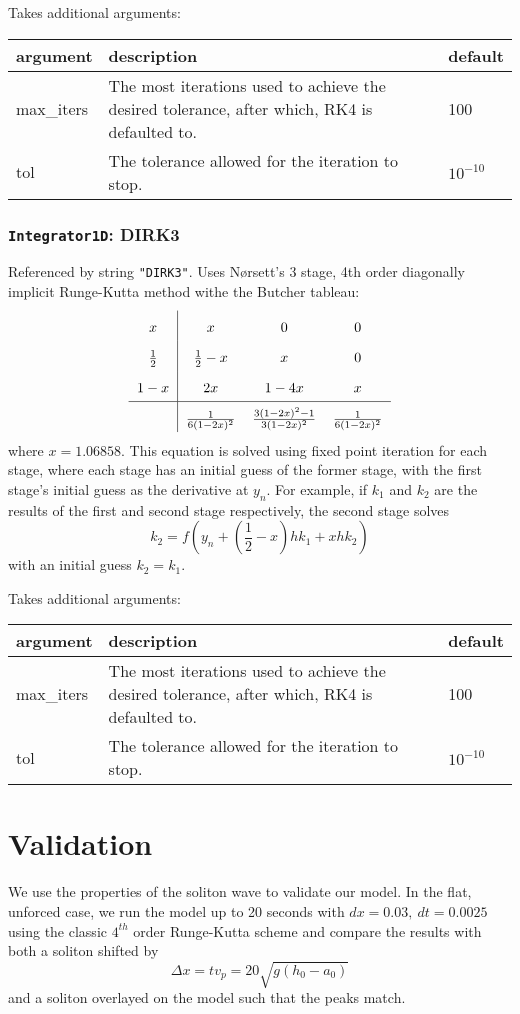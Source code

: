 \documentclass[10pt,a4paper]{article}
\newenvironment{optarglist}
    {\begin{center}
    \begin{tabular}{l|p{10cm}|l}
    argument & description & default\\
    \hline
    }
    { 
    \end{tabular} 
    \end{center}
    }
\begin{document}
Takes additional arguments:

\begin{optarglist}
max\_iters & The most iterations used to achieve the desired tolerance, after which, RK4 is defaulted to. & 100\\\hline
tol & The tolerance allowed for the iteration to stop. & $10^{-10}$
\end{optarglist}




\subsubsection{\texttt{Integrator1D}: DIRK3}
Referenced by string \texttt{"DIRK3"}. Uses Nørsett's 3 stage, 4th order diagonally implicit Runge-Kutta method withe the Butcher tableau:
\[\arraycolsep=6pt\def\arraystretch{1.8}\begin{array}{c|ccc}
x & x & 0 & 0\\
\frac12 & \frac12-x & x & 0\\
1-x & 2x & 1 - 4x & x\\
\hline
&\frac{1}{6(1-2x)^2} & \frac{3(1-2x)^2-1}{3(1-2x)^2} & \frac1{6(1-2x)^2}
\end{array}
\]
where $x = 1.06858$.
This equation is solved using fixed point iteration for each stage, where each stage has an initial guess of the former stage, with the first stage's initial guess as the derivative at $y_n$. For example, if $k_1$ and $k_2$ are the results of the first and second stage respectively, the second stage solves
$$k_2 = f\left(y_{n} + \left(\frac{1}{2}-x\right)hk_1 + xhk_2\right)$$
with an initial guess $k_2 = k_1$.

Takes additional arguments:

\begin{optarglist}
max\_iters & The most iterations used to achieve the desired tolerance, after which, RK4 is defaulted to. & 100\\\hline
tol & The tolerance allowed for the iteration to stop. & $10^{-10}$
\end{optarglist}

\pagebreak

\section{Validation}
We use the properties of the soliton wave to validate our model. In the flat, unforced case, we run the model up to 20 seconds with $dx = 0.03,~dt=0.0025$ using the classic $4^{th}$ order Runge-Kutta scheme and compare the results with both a soliton shifted by $$\Delta x = t v_p = 20\sqrt{g(h_0-a_0)}$$ and a soliton overlayed on the model such that the peaks match.
\end{document}
